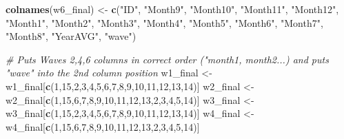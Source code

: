 \documentclass[
]{book}
\newenvironment{Shaded}{\begin{snugshade}}{\end{snugshade}}
\newcommand{\CommentTok}[1]{\textcolor[rgb]{0.56,0.35,0.01}{\textit{#1}}}
\newcommand{\DecValTok}[1]{\textcolor[rgb]{0.00,0.00,0.81}{#1}}
\newcommand{\KeywordTok}[1]{\textcolor[rgb]{0.13,0.29,0.53}{\textbf{#1}}}
\newcommand{\NormalTok}[1]{#1}
\newcommand{\StringTok}[1]{\textcolor[rgb]{0.31,0.60,0.02}{#1}}
\begin{document}
\begin{Shaded}
\begin{Highlighting}[]
\KeywordTok{colnames}\NormalTok{(w6_final) <-}\StringTok{ }\KeywordTok{c}\NormalTok{(}\StringTok{"ID"}\NormalTok{, }\StringTok{"Month9"}\NormalTok{, }\StringTok{"Month10"}\NormalTok{, }\StringTok{"Month11"}\NormalTok{, }\StringTok{"Month12"}\NormalTok{, }\StringTok{"Month1"}\NormalTok{, }\StringTok{"Month2"}\NormalTok{, }\StringTok{"Month3"}\NormalTok{, }\StringTok{"Month4"}\NormalTok{, }\StringTok{"Month5"}\NormalTok{, }\StringTok{"Month6"}\NormalTok{, }\StringTok{"Month7"}\NormalTok{, }\StringTok{"Month8"}\NormalTok{, }\StringTok{"YearAVG"}\NormalTok{, }\StringTok{"wave"}\NormalTok{)}

\CommentTok{# Puts Waves 2,4,6 columns in correct order ("month1, month2...) and puts "wave" into the 2nd column position}
\NormalTok{w1_final <-}\StringTok{ }\NormalTok{w1_final[}\KeywordTok{c}\NormalTok{(}\DecValTok{1}\NormalTok{,}\DecValTok{15}\NormalTok{,}\DecValTok{2}\NormalTok{,}\DecValTok{3}\NormalTok{,}\DecValTok{4}\NormalTok{,}\DecValTok{5}\NormalTok{,}\DecValTok{6}\NormalTok{,}\DecValTok{7}\NormalTok{,}\DecValTok{8}\NormalTok{,}\DecValTok{9}\NormalTok{,}\DecValTok{10}\NormalTok{,}\DecValTok{11}\NormalTok{,}\DecValTok{12}\NormalTok{,}\DecValTok{13}\NormalTok{,}\DecValTok{14}\NormalTok{)]}
\NormalTok{w2_final <-}\StringTok{ }\NormalTok{w2_final[}\KeywordTok{c}\NormalTok{(}\DecValTok{1}\NormalTok{,}\DecValTok{15}\NormalTok{,}\DecValTok{6}\NormalTok{,}\DecValTok{7}\NormalTok{,}\DecValTok{8}\NormalTok{,}\DecValTok{9}\NormalTok{,}\DecValTok{10}\NormalTok{,}\DecValTok{11}\NormalTok{,}\DecValTok{12}\NormalTok{,}\DecValTok{13}\NormalTok{,}\DecValTok{2}\NormalTok{,}\DecValTok{3}\NormalTok{,}\DecValTok{4}\NormalTok{,}\DecValTok{5}\NormalTok{,}\DecValTok{14}\NormalTok{)]}
\NormalTok{w3_final <-}\StringTok{ }\NormalTok{w3_final[}\KeywordTok{c}\NormalTok{(}\DecValTok{1}\NormalTok{,}\DecValTok{15}\NormalTok{,}\DecValTok{2}\NormalTok{,}\DecValTok{3}\NormalTok{,}\DecValTok{4}\NormalTok{,}\DecValTok{5}\NormalTok{,}\DecValTok{6}\NormalTok{,}\DecValTok{7}\NormalTok{,}\DecValTok{8}\NormalTok{,}\DecValTok{9}\NormalTok{,}\DecValTok{10}\NormalTok{,}\DecValTok{11}\NormalTok{,}\DecValTok{12}\NormalTok{,}\DecValTok{13}\NormalTok{,}\DecValTok{14}\NormalTok{)]}
\NormalTok{w4_final <-}\StringTok{ }\NormalTok{w4_final[}\KeywordTok{c}\NormalTok{(}\DecValTok{1}\NormalTok{,}\DecValTok{15}\NormalTok{,}\DecValTok{6}\NormalTok{,}\DecValTok{7}\NormalTok{,}\DecValTok{8}\NormalTok{,}\DecValTok{9}\NormalTok{,}\DecValTok{10}\NormalTok{,}\DecValTok{11}\NormalTok{,}\DecValTok{12}\NormalTok{,}\DecValTok{13}\NormalTok{,}\DecValTok{2}\NormalTok{,}\DecValTok{3}\NormalTok{,}\DecValTok{4}\NormalTok{,}\DecValTok{5}\NormalTok{,}\DecValTok{14}\NormalTok{)]}

\end{Highlighting}
\end{Shaded}
\end{document}
